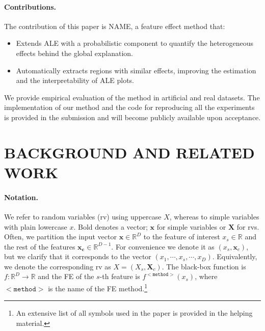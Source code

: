 \documentclass[twoside]{article}
\newcommand{\xc}{\mathbf{x_c}}
\newcommand{\xb}{\mathbf{x}}
\begin{document}
\paragraph{Contributions.} The contribution of this paper is NAME, a
feature effect method that:

\begin{itemize}
\item Extends ALE with a probabilistic component to quantify the
  heterogeneous effects behind the global explanation.
\item Automatically extracts regions with similar effects, improving
  the estimation and the interpretability of ALE plots.
\end{itemize}

We provide empirical evaluation of the method in artificial and real
datasets. The implementation of our method and the code for
reproducing all the experiments is provided in the submission and will
become publicly available upon acceptance.


\section{BACKGROUND AND RELATED WORK}

\paragraph{Notation.} We refer to random variables (rv) using
uppercase \( X \), whereas to simple variables with plain lowercase
\( x \). Bold denotes a vector; \( \xb \) for simple variables or
\(\mathbf{X}\) for rvs. Often, we partition the input vector
\(\xb \in \mathbb{R}^D\) to the feature of interest
\(x_s \in \mathbb{R} \) and the rest of the features
\(\xc \in \mathbb{R}^{D-1}\). For convenience we denote it as
\((x_s, \mathbf{x}_c)\), but we clarify that it corresponds to the
vector \((x_1, \cdots , x_s, \cdots, x_D)\). Equivalently, we denote
the corresponding rv as \(X = (X_s, \mathbf{X}_c)\). The black-box
function is \(f : \mathbb{R}^D \rightarrow \mathbb{R}\) and the
FE of the \(s\)-th feature is
\(f^{\mathtt{<method>}}(x_s)\), where \(\mathtt{<method>}\) is the
name of the FE method.\footnote{An extensive list of all
  symbols used in the paper is provided in the helping material.}
\end{document}
